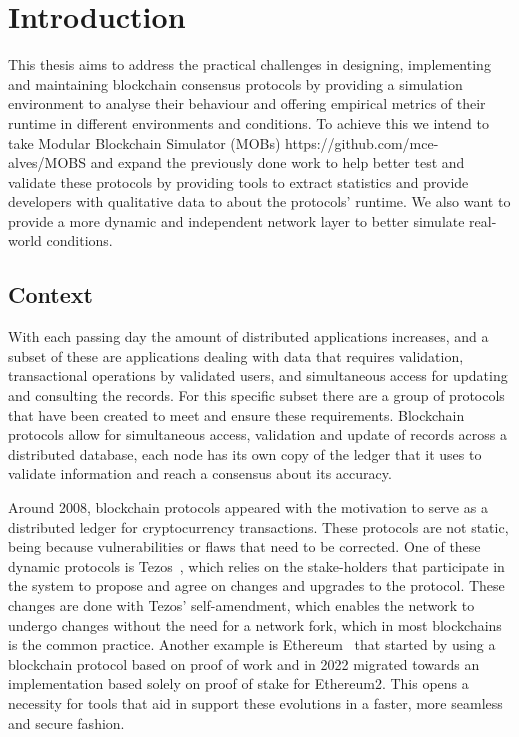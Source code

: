 
%

\chapter{Introduction}\label{cha:introduction}

This thesis aims to address the practical challenges in designing, implementing and maintaining blockchain consensus
protocols by providing a simulation environment to analyse their behaviour and offering empirical metrics of their runtime in
different environments and conditions. To achieve this we intend to take Modular Blockchain Simulator (MOBs) https://github.com/mce-alves/MOBS
and expand the previously done work to help better test and validate these protocols by providing tools to extract statistics and 
provide developers with qualitative data to about the protocols' runtime. We also want to provide a more dynamic and independent network layer
to better simulate real-world conditions.


\section{Context}\label{sub:context}
With each passing day the amount of distributed applications increases, and a subset of these are applications
dealing with data that requires validation, transactional operations by validated users, and simultaneous access for updating and
consulting the records. For this specific subset there are a group of protocols that have been created to meet and ensure
these requirements. Blockchain protocols allow for simultaneous access, validation and update of records across
a distributed database, each node has its own copy of the ledger that it uses to validate information and reach a consensus
about its accuracy.

Around 2008, blockchain protocols appeared with the motivation
to serve as a distributed ledger for cryptocurrency transactions. These protocols are not static, being because vulnerabilities 
or flaws that need to be corrected.
One of these dynamic protocols is Tezos~\cite{tezos}, which relies on the stake-holders that participate in the system to propose and
agree on changes and upgrades to the protocol. These changes are done with Tezos' self-amendment, which enables the network to undergo
changes without the need for a network fork, which in most blockchains is the common practice.
Another example is Ethereum~\cite{ethereum} that started by using a blockchain protocol based on proof
of work and in 2022 migrated towards an implementation based solely on proof of stake for Ethereum2.
This opens a necessity for tools that aid in support these evolutions in a faster, more seamless and secure fashion.

